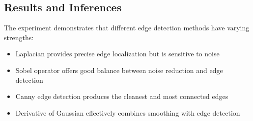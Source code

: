 \documentclass[12pt,a4paper]{article}
\begin{document}
\subsection{Results and Inferences}
The experiment demonstrates that different edge detection methods have varying strengths:
\begin{itemize}
  \item Laplacian provides precise edge localization but is sensitive to noise
  \item Sobel operator offers good balance between noise reduction and edge detection
  \item Canny edge detection produces the cleanest and most connected edges
  \item Derivative of Gaussian effectively combines smoothing with edge detection
\end{itemize}
\end{document}
